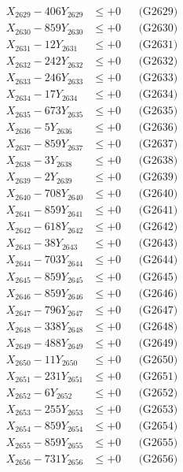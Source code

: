 \documentclass[a4paper,10pt]{article}
\begin{document}
{\begin{align}
X_{2629} - 406Y_{2629} &\leq +0 && \text{(G2629)} \\
X_{2630} - 859Y_{2630} &\leq +0 && \text{(G2630)} \\
\allowbreak
X_{2631} - 12Y_{2631} &\leq +0 && \text{(G2631)} \\
X_{2632} - 242Y_{2632} &\leq +0 && \text{(G2632)} \\
X_{2633} - 246Y_{2633} &\leq +0 && \text{(G2633)} \\
X_{2634} - 17Y_{2634} &\leq +0 && \text{(G2634)} \\
X_{2635} - 673Y_{2635} &\leq +0 && \text{(G2635)} \\
X_{2636} - 5Y_{2636} &\leq +0 && \text{(G2636)} \\
X_{2637} - 859Y_{2637} &\leq +0 && \text{(G2637)} \\
X_{2638} - 3Y_{2638} &\leq +0 && \text{(G2638)} \\
X_{2639} - 2Y_{2639} &\leq +0 && \text{(G2639)} \\
X_{2640} - 708Y_{2640} &\leq +0 && \text{(G2640)} \\
\allowbreak
X_{2641} - 859Y_{2641} &\leq +0 && \text{(G2641)} \\
X_{2642} - 618Y_{2642} &\leq +0 && \text{(G2642)} \\
X_{2643} - 38Y_{2643} &\leq +0 && \text{(G2643)} \\
X_{2644} - 703Y_{2644} &\leq +0 && \text{(G2644)} \\
X_{2645} - 859Y_{2645} &\leq +0 && \text{(G2645)} \\
X_{2646} - 859Y_{2646} &\leq +0 && \text{(G2646)} \\
X_{2647} - 796Y_{2647} &\leq +0 && \text{(G2647)} \\
X_{2648} - 338Y_{2648} &\leq +0 && \text{(G2648)} \\
X_{2649} - 488Y_{2649} &\leq +0 && \text{(G2649)} \\
X_{2650} - 11Y_{2650} &\leq +0 && \text{(G2650)} \\
\allowbreak
X_{2651} - 231Y_{2651} &\leq +0 && \text{(G2651)} \\
X_{2652} - 6Y_{2652} &\leq +0 && \text{(G2652)} \\
X_{2653} - 255Y_{2653} &\leq +0 && \text{(G2653)} \\
X_{2654} - 859Y_{2654} &\leq +0 && \text{(G2654)} \\
X_{2655} - 859Y_{2655} &\leq +0 && \text{(G2655)} \\
X_{2656} - 731Y_{2656} &\leq +0 && \text{(G2656)} \\

\end{align}}
\end{document}
